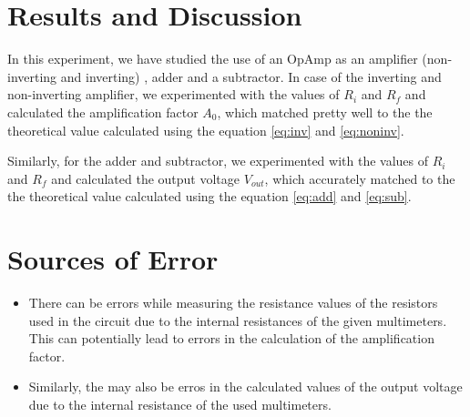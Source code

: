 \documentclass[12pt]{article}
\begin{document}
\section{Results and Discussion}
In this experiment, we have studied the use of an OpAmp as an amplifier (non-inverting and inverting) , adder and a subtractor. 
In case of the inverting and non-inverting amplifier, we experimented with the values of $R_i$ and $R_f$ and calculated the amplification factor $A_0$, which matched pretty well to the the theoretical value calculated using the equation \ref{eq:inv} and \ref{eq:noninv}.

\noindent
Similarly, for the adder and subtractor, we experimented with the values of $R_i$ and $R_f$ and calculated the output voltage $V_{out}$, which accurately matched to the the theoretical value calculated using the equation \ref{eq:add} and \ref{eq:sub}.



\section{Sources of Error}
\begin{itemize}
  \item There can be errors while measuring the resistance values of the resistors used in the circuit due to the internal resistances of the given multimeters. This can potentially lead to errors in the calculation of the amplification factor.
  \item Similarly, the may also be erros in the calculated values of the output voltage due to the internal resistance of the used multimeters.
\end{itemize}
\end{document}
